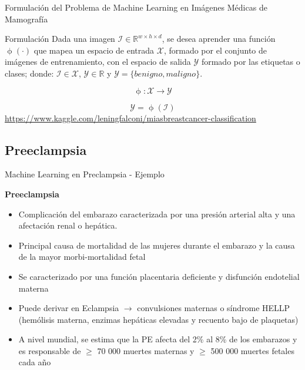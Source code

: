 \documentclass{beamer}
\DeclareMathOperator{\ypred}{\phi}  %
\begin{document}
\begin{frame}{Formulación del Problema de Machine Learning en Imágenes Médicas de Mamografía}
    \begin{block}{Formulación}
    Dada una imagen $\mathcal{I} \in \mathbb{R}^{w \times h \times d}$, se desea aprender una función $\ypred(\cdot)$ que mapea un espacio de entrada $\mathcal{X}$, formado por el conjunto de imágenes de entrenamiento, con el espacio de salida $\mathcal{Y}$ formado por las etiquetas o clases; donde: $ \mathcal{I} \in \mathbf{\mathcal{X}}$,  $\mathcal{Y} \in \mathbb{R}$ y $\mathcal{Y} = \{benigno, maligno\}$. 
    \end{block}
    \begin{equation}
        \ypred: \mathbf{\mathcal{X}} \rightarrow \mathcal{Y}    
    \end{equation}

    \begin{equation}
        \mathcal{Y} = \ypred(\mathcal{I})
    \end{equation}
    \scriptsize
    \url{https://www.kaggle.com/leningfalconi/miasbreastcancer-classification}
\end{frame}
\subsection{Preeclampsia}
\begin{frame}{Machine Learning en Preclampsia - Ejemplo}
    
    \textbf{Preeclampsia}
    
    \begin{itemize}
        \item Complicación del embarazo caracterizada por una presión arterial alta y una afectación renal o hepática. 
        \item Principal causa de mortalidad de las mujeres durante el embarazo y la causa de la mayor morbi-mortalidad fetal
        \item Se caracterizado por una función placentaria deficiente y disfunción endotelial materna
        \item Puede derivar en Eclampsia $\rightarrow$ convulsiones maternas o síndrome HELLP (hemólisis materna, enzimas hepáticas elevadas y recuento bajo de plaquetas)
        \item A nivel mundial, se estima que la PE afecta del 2\% al 8\% de los embarazos y es responsable de $\ge$ 70 000 muertes maternas y $\ge$ 500 000 muertes fetales cada año 

    \end{itemize}
\end{frame}
\end{document}
